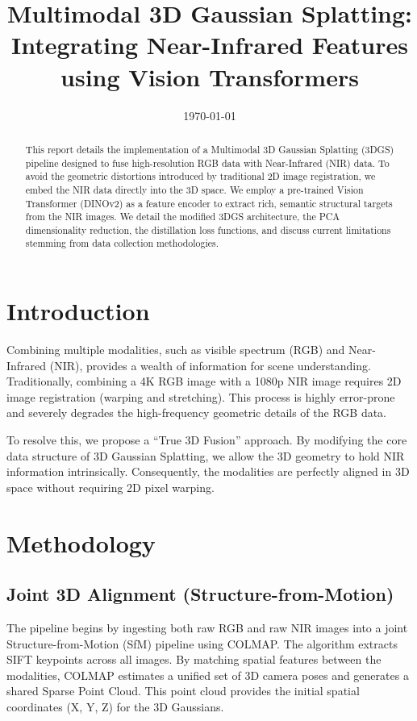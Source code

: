 \documentclass[12pt]{article}
\title{Multimodal 3D Gaussian Splatting:\\Integrating Near-Infrared Features using Vision Transformers}
\author{}
\date{\today}
\begin{document}
\maketitle

\begin{abstract}
This report details the implementation of a Multimodal 3D Gaussian Splatting (3DGS) pipeline designed to fuse high-resolution RGB data with Near-Infrared (NIR) data. To avoid the geometric distortions introduced by traditional 2D image registration, we embed the NIR data directly into the 3D space. We employ a pre-trained Vision Transformer (DINOv2) as a feature encoder to extract rich, semantic structural targets from the NIR images. We detail the modified 3DGS architecture, the PCA dimensionality reduction, the distillation loss functions, and discuss current limitations stemming from data collection methodologies.
\end{abstract}

\section{Introduction}
Combining multiple modalities, such as visible spectrum (RGB) and Near-Infrared (NIR), provides a wealth of information for scene understanding. Traditionally, combining a 4K RGB image with a 1080p NIR image requires 2D image registration (warping and stretching). This process is highly error-prone and severely degrades the high-frequency geometric details of the RGB data.

To resolve this, we propose a ``True 3D Fusion'' approach. By modifying the core data structure of 3D Gaussian Splatting, we allow the 3D geometry to hold NIR information intrinsically. Consequently, the modalities are perfectly aligned in 3D space without requiring 2D pixel warping.

\section{Methodology}

\subsection{Joint 3D Alignment (Structure-from-Motion)}
The pipeline begins by ingesting both raw RGB and raw NIR images into a joint Structure-from-Motion (SfM) pipeline using COLMAP. The algorithm extracts SIFT keypoints across all images. By matching spatial features between the modalities, COLMAP estimates a unified set of 3D camera poses and generates a shared Sparse Point Cloud. This point cloud provides the initial spatial coordinates (X, Y, Z) for the 3D Gaussians.
\end{document}
